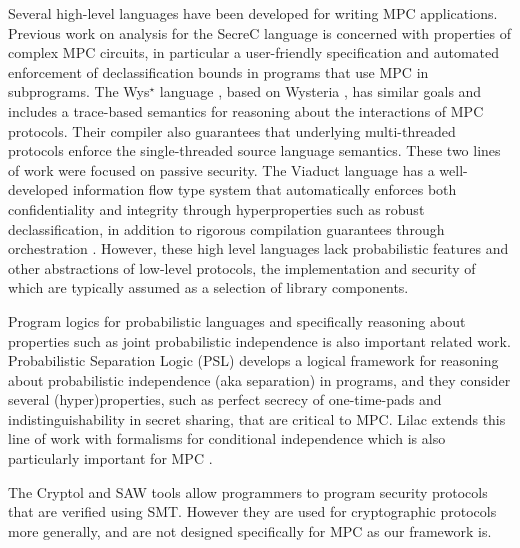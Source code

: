 Several high-level languages have been developed for writing MPC
applications. Previous work on analysis for the
SecreC language \cite{almeida2018enforcing,10.1145/2637113.2637119} is
concerned with properties of complex MPC circuits, in particular a
user-friendly specification and automated enforcement of
declassification bounds in programs that use MPC in subprograms. The
Wys$^\star$ language \cite{wysstar}, based on Wysteria
\cite{rastogi2014wysteria}, has similar goals and includes a
trace-based semantics for reasoning about the interactions of MPC
protocols. Their compiler also guarantees that underlying
multi-threaded protocols enforce the single-threaded source language
semantics. These two lines of work were focused on passive
security. The Viaduct language \cite{10.1145/3453483.3454074} has a
well-developed information flow type system that automatically
enforces both confidentiality and integrity through hyperproperties
such as robust declassification, in addition to rigorous compilation
guarantees through orchestration \cite{viaduct-UC}. However, these
high level languages lack probabilistic features and other
abstractions of low-level protocols, the implementation and security
of which are typically assumed as a selection of library components.

Program logics for probabilistic languages and specifically reasoning
about properties such as joint probabilistic independence is also
important related work. Probabilistic Separation Logic (PSL)
\cite{barthe2019probabilistic} develops a logical framework for
reasoning about probabilistic independence (aka separation) in
programs, and they consider several (hyper)properties, such as perfect
secrecy of one-time-pads and indistinguishability in secret sharing,
that are critical to MPC. Lilac \cite{li2023lilac} extends this line
of work with formalisms for conditional independence which is 
also particularly important for MPC \cite{skalka-near-ppdp24}.

The Cryptol and SAW tools \cite{10.1007/978-3-319-48869-1_5} allow
programmers to program security protocols that are verified using
SMT. However they are used for cryptographic protocols more generally,
and are not designed specifically for MPC as our framework is.
